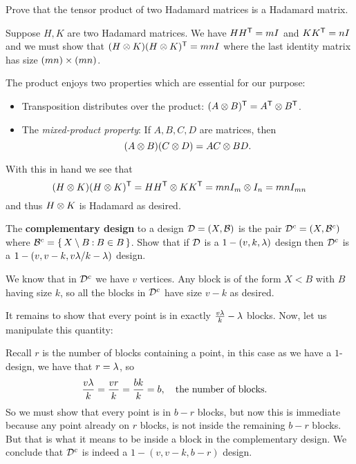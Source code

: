 \documentclass[12pt]{memoir}
\begin{document}
\begin{Ej}[Exercise 1]
    Prove that the tensor product of two Hadamard matrices is a Hadamard matrix.
\end{Ej}

\begin{ptcbr}
Suppose $H,K$ are two Hadamard matrices. We have $HH^{\mathsf{T}}=mI$ and $KK^{\mathsf{T}}=nI$ and we must show that $(H\otimes K)(H\otimes K)^{\mathsf{T}}=mnI$ where the last identity matrix has size $(mn)\times(mn)$.\par 
The product enjoys two properties which are essential for our purpose:
\begin{itemize}
    \item Transposition distributes over the product: $(A\otimes B)^{\mathsf{T}}=A^{\mathsf{T}}\otimes B^{\mathsf{T}}$.
    \item The \emph{mixed-product property}: If $A,B,C,D$ are matrices, then 
    $$(A\otimes B)(C\otimes D)=AC\otimes BD.$$
\end{itemize}
With this in hand we see that
$$(H\otimes K)(H\otimes K)^{\mathsf{T}}=HH^{\mathsf{T}}\otimes KK^{\mathsf{T}}=mn I_m\otimes I_n=mn I_{mn}$$
and thus $H\otimes K$ is Hadamard as desired.
\end{ptcbr}

\begin{Ej}[Exercise 4]
    The \textbf{complementary design} to a design $\mathcal{D} = (X, \mathcal{B})$ is the pair $\mathcal{D}^c = (X, \mathcal{B}^c)$ where $\mathcal{B}^c = \{\,X \setminus B \mathbin{:} B \in B\,\}$. Show that if $\mathcal{D}$ is a $1 - (v, k, \lambda)$ design then $\mathcal{D}^c$ is a $1 - (v, v - k, v\lambda/k-\lambda)$ design.
\end{Ej}
\begin{ptcbr}
We know that in $\mathcal{D}^c$ we have $v$ vertices. Any block is of the form $X\less B$ with $B$ having size $k$, so all the blocks in $\mathcal{D}^c$ have size $v-k$ as desired.\par 
It remains to show that every point is in exactly $\frac{v\lambda}{k}-\lambda$ blocks. Now, let us manipulate this quantity:\par 
Recall $r$ is the number of blocks containing a point, in this case as we have a $1$-design, we have that $r=\lambda$, so 
$$\frac{v\lambda}{k}=\frac{vr}{k}=\frac{bk}{k}=b,\quad\text{the number of blocks.}\quad$$
So we must show that every point is in $b-r$ blocks, but now this is immediate because any point already on $r$ blocks, is not inside the remaining $b-r$ blocks. But that is what it means to be inside a block in the complementary design. We conclude that $\mathcal{D}^c$ is indeed a $1-(v,v-k,b-r)$ design.
\end{ptcbr}
\end{document}
